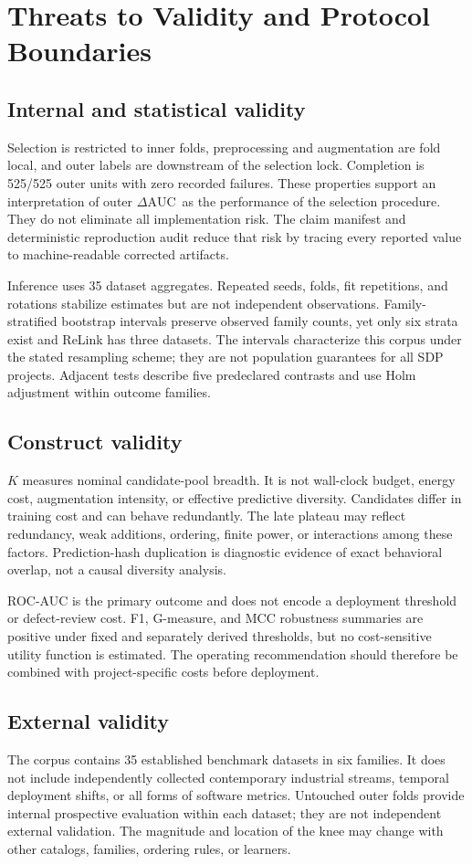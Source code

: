 \documentclass[referee]{USG}
\newcommand{\dauc}{\ensuremath{\Delta\mathrm{AUC}}}
\begin{document}
\section{Threats to Validity and Protocol Boundaries}
\subsection{Internal and statistical validity}
Selection is restricted to inner folds, preprocessing and augmentation are fold local, and outer labels are downstream of the selection lock. Completion is 525/525 outer units with zero recorded failures. These properties support an interpretation of outer \dauc\ as the performance of the selection procedure. They do not eliminate all implementation risk. The claim manifest and deterministic reproduction audit reduce that risk by tracing every reported value to machine-readable corrected artifacts.

Inference uses 35 dataset aggregates. Repeated seeds, folds, fit repetitions, and rotations stabilize estimates but are not independent observations. Family-stratified bootstrap intervals preserve observed family counts, yet only six strata exist and ReLink has three datasets. The intervals characterize this corpus under the stated resampling scheme; they are not population guarantees for all SDP projects. Adjacent tests describe five predeclared contrasts and use Holm adjustment within outcome families.

\subsection{Construct validity}
$K$ measures nominal candidate-pool breadth. It is not wall-clock budget, energy cost, augmentation intensity, or effective predictive diversity. Candidates differ in training cost and can behave redundantly. The late plateau may reflect redundancy, weak additions, ordering, finite power, or interactions among these factors. Prediction-hash duplication is diagnostic evidence of exact behavioral overlap, not a causal diversity analysis.

ROC-AUC is the primary outcome and does not encode a deployment threshold or defect-review cost. F1, G-measure, and MCC robustness summaries are positive under fixed and separately derived thresholds, but no cost-sensitive utility function is estimated. The operating recommendation should therefore be combined with project-specific costs before deployment.

\subsection{External validity}
The corpus contains 35 established benchmark datasets in six families. It does not include independently collected contemporary industrial streams, temporal deployment shifts, or all forms of software metrics. Untouched outer folds provide internal prospective evaluation within each dataset; they are not independent external validation. The magnitude and location of the knee may change with other catalogs, families, ordering rules, or learners.
\end{document}

